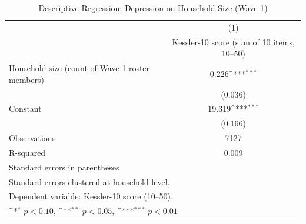 \begin{table}[htbp]\centering
\def\sym#1{\ifmmode^{#1}\else\(^{#1}\)\fi}
\caption{Descriptive Regression: Depression on Household Size (Wave 1)}
\begin{tabular}{l*{1}{c}}
\toprule
                    &\multicolumn{1}{c}{(1)}\\
                    &\multicolumn{1}{c}{Kessler-10 score (sum of 10 items, 10–50)}\\
\midrule
Household size (count of Wave 1 roster members)&       0.226\sym{***}\\
                    &     (0.036)         \\
\addlinespace
Constant            &      19.319\sym{***}\\
                    &     (0.166)         \\
\midrule
Observations        &        7127         \\
R-squared           &       0.009         \\
\bottomrule
\multicolumn{2}{l}{\footnotesize Standard errors in parentheses}\\
\multicolumn{2}{l}{\footnotesize Standard errors clustered at household level.}\\
\multicolumn{2}{l}{\footnotesize Dependent variable: Kessler-10 score (10--50).}\\
\multicolumn{2}{l}{\footnotesize \sym{*} \(p<0.10\), \sym{**} \(p<0.05\), \sym{***} \(p<0.01\)}\\
\end{tabular}
\end{table}
